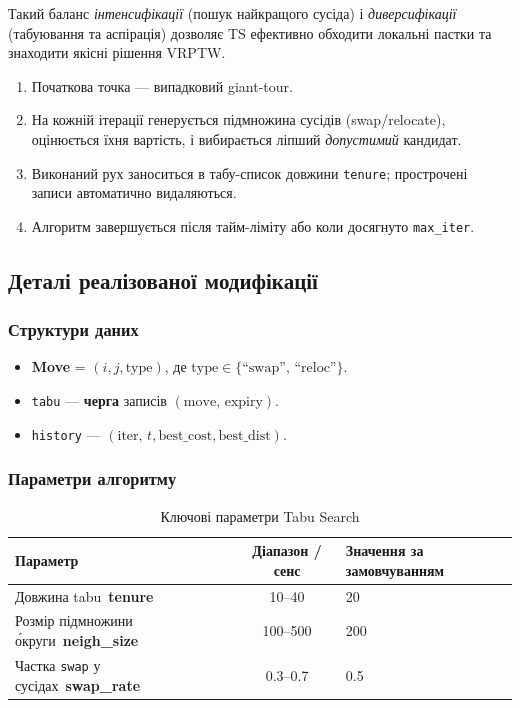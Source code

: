 \documentclass[12pt,a4paper]{article}
\begin{document}
Такий баланс \emph{інтенсифікації} (пошук найкращого сусіда)
і \emph{диверсифікації} (табуювання та аспірація)
дозволяє TS ефективно обходити локальні пастки
та знаходити якісні рішення VRPTW.

\begin{enumerate}
  \item Початкова точка — випадковий giant-tour.
  \item На кожній ітерації генерується підмножина
        сусідів (swap/relocate), оцінюється їхня вартість,
        і вибирається ліпший \emph{допустимий} кандидат.
  \item Виконаний рух заноситься в табу-список довжини
        \texttt{tenure}; прострочені записи автоматично
        видаляються.
  \item Алгоритм завершується після тайм-ліміту
        або коли досягнуто \texttt{max\_iter}.
\end{enumerate}

\subsection{Деталі реалізованої модифікації}
\subsubsection{Структури даних}
\begin{itemize}
  \item \textbf{Move} = \((i,j,\text{type})\),  
        де \(\text{type}\in\{\text{``swap''},\,\text{``reloc''}\}\).
  \item \texttt{tabu} — \textbf{черга} записів \((\text{move},\,\text{expiry})\).
  \item \texttt{history} — \((\text{iter},\,t,\text{best\_cost},\text{best\_dist})\).
\end{itemize}

\subsubsection{Параметри алгоритму}
\begin{table}[h]
\centering
\begin{tabular}{lcl}
\toprule
Параметр & Діапазон / сенс & Значення за замовчуванням \\
\midrule
Довжина tabu~\textbf{tenure}            & 10–40 & 20 \\
Розмір підмножини о́круги~\textbf{neigh\_size} & 100–500 & 200 \\
Частка \texttt{swap} у сусідах~\textbf{swap\_rate} & 0.3–0.7 & 0.5 \\
\bottomrule
\end{tabular}
\caption{Ключові параметри Tabu Search}
\end{table}
\end{document}
